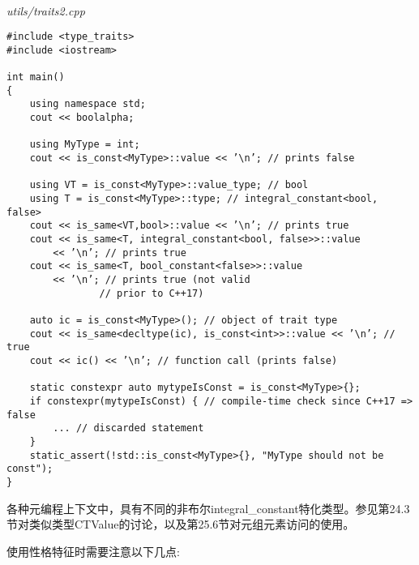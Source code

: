 \hspace*{\fill} \\ %
\noindent
\textit{utils/traits2.cpp}
\begin{lstlisting}[style=styleCXX]
#include <type_traits>
#include <iostream>

int main()
{
	using namespace std;
	cout << boolalpha;
	
	using MyType = int;
	cout << is_const<MyType>::value << ’\n’; // prints false
	
	using VT = is_const<MyType>::value_type; // bool
	using T = is_const<MyType>::type; // integral_constant<bool, false>
	cout << is_same<VT,bool>::value << ’\n’; // prints true
	cout << is_same<T, integral_constant<bool, false>>::value
		<< ’\n’; // prints true
	cout << is_same<T, bool_constant<false>>::value
		<< ’\n’; // prints true (not valid	
				// prior to C++17)
				
	auto ic = is_const<MyType>(); // object of trait type
	cout << is_same<decltype(ic), is_const<int>>::value << ’\n’; // true
	cout << ic() << ’\n’; // function call (prints false)
	
	static constexpr auto mytypeIsConst = is_const<MyType>{};
	if constexpr(mytypeIsConst) { // compile-time check since C++17 => false
		... // discarded statement
	}
	static_assert(!std::is_const<MyType>{}, "MyType should not be const");
}
\end{lstlisting}

各种元编程上下文中，具有不同的非布尔integral\_constant特化类型。参见第24.3节对类似类型CTValue的讨论，以及第25.6节对元组元素访问的使用。


使用性格特征时需要注意以下几点:

